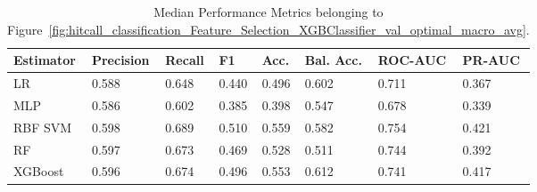 \begin{longtable}{llllllll}
\caption{Median Performance Metrics belonging to Figure~\ref{fig:hitcall_classification_Feature_Selection_XGBClassifier_val_optimal_macro_avg}.}\label{tab:table:hitcall_classification_feature_selection_xgbclassifier_val_optimal_macro_avg}\\
\toprule
\midrule
\small Estimator & \small Precision & \small Recall & \small F1 & \small Acc. & \small Bal. Acc. & \small ROC-AUC & \small PR-AUC\\
\hline
LR & 0.588 & 0.648 & 0.440 & 0.496 & 0.602 & 0.711 & 0.367\\
MLP & 0.586 & 0.602 & 0.385 & 0.398 & 0.547 & 0.678 & 0.339\\
RBF SVM & 0.598 & 0.689 & 0.510 & 0.559 & 0.582 & 0.754 & 0.421\\
RF & 0.597 & 0.673 & 0.469 & 0.528 & 0.511 & 0.744 & 0.392\\
XGBoost & 0.596 & 0.674 & 0.496 & 0.553 & 0.612 & 0.741 & 0.417\\
\bottomrule
\end{longtable}